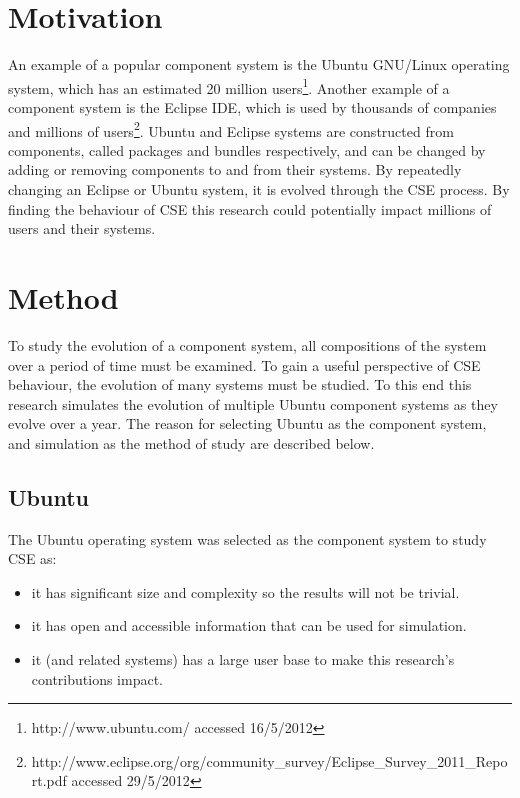 \section{Motivation}
An example of a popular component system is the Ubuntu GNU/Linux operating system, which has an estimated 20 million users\footnote{http://www.ubuntu.com/ accessed 16/5/2012}. 
Another example of a component system is the Eclipse IDE, which is used by thousands of companies and millions of users\footnote{http://www.eclipse.org/org/community\_survey/Eclipse\_Survey\_2011\_Report.pdf  accessed 29/5/2012}.
Ubuntu and Eclipse systems are constructed from components, called packages and bundles respectively, 
and can be changed by adding or removing components to and from their systems.
By repeatedly changing an Eclipse or Ubuntu system, it is evolved through the CSE process.
By finding the behaviour of CSE this research could potentially impact millions of users and their systems.

\section{Method}
To study the evolution of a component system, all compositions of the system over a period of time must be examined. 
To gain a useful perspective of CSE behaviour, the evolution of many systems must be studied.
To this end this research simulates the evolution of multiple Ubuntu component systems as they evolve over a year.
The reason for selecting Ubuntu as the component system, and simulation as the method of study are described below.

\subsection{Ubuntu}
The Ubuntu operating system was selected as the component system to study CSE as:
\begin{itemize}
  \item it has significant size and complexity so the results will not be trivial.
  \item it has open and accessible information that can be used for simulation.
  \item it (and related systems) has a large user base to make this research's contributions impact.
\end{itemize} 


